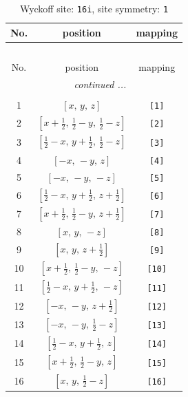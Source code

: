 \documentclass[fleqn,8pt]{jsarticle}
\begin{document}
\begin{longtable}{ccc}
\caption{Wyckoff site: {\tt 16i}, site symmetry: {\tt 1}}
 \\
 \hline \hline
No. & position & mapping \\ \hline \endfirsthead

\multicolumn{2}{l}{\tablename\ \thetable{}} \\
 \hline \hline
No. & position & mapping \\ \hline \endhead

 \hline \hline
\multicolumn{2}{r}{\footnotesize\it continued ...} \\ \endfoot

 \hline \hline
\multicolumn{2}{r}{} \\ \endlastfoot

1 & $\left[ x,\, y,\, z \right]$ & {\tt [1]} \\ \hline
2 & $\left[ x + \frac{1}{2},\, \frac{1}{2} - y,\, \frac{1}{2} - z \right]$ & {\tt [2]} \\ \hline
3 & $\left[ \frac{1}{2} - x,\, y + \frac{1}{2},\, \frac{1}{2} - z \right]$ & {\tt [3]} \\ \hline
4 & $\left[ - x,\, - y,\, z \right]$ & {\tt [4]} \\ \hline
5 & $\left[ - x,\, - y,\, - z \right]$ & {\tt [5]} \\ \hline
6 & $\left[ \frac{1}{2} - x,\, y + \frac{1}{2},\, z + \frac{1}{2} \right]$ & {\tt [6]} \\ \hline
7 & $\left[ x + \frac{1}{2},\, \frac{1}{2} - y,\, z + \frac{1}{2} \right]$ & {\tt [7]} \\ \hline
8 & $\left[ x,\, y,\, - z \right]$ & {\tt [8]} \\ \hline
9 & $\left[ x,\, y,\, z + \frac{1}{2} \right]$ & {\tt [9]} \\ \hline
10 & $\left[ x + \frac{1}{2},\, \frac{1}{2} - y,\, - z \right]$ & {\tt [10]} \\ \hline
11 & $\left[ \frac{1}{2} - x,\, y + \frac{1}{2},\, - z \right]$ & {\tt [11]} \\ \hline
12 & $\left[ - x,\, - y,\, z + \frac{1}{2} \right]$ & {\tt [12]} \\ \hline
13 & $\left[ - x,\, - y,\, \frac{1}{2} - z \right]$ & {\tt [13]} \\ \hline
14 & $\left[ \frac{1}{2} - x,\, y + \frac{1}{2},\, z \right]$ & {\tt [14]} \\ \hline
15 & $\left[ x + \frac{1}{2},\, \frac{1}{2} - y,\, z \right]$ & {\tt [15]} \\ \hline
16 & $\left[ x,\, y,\, \frac{1}{2} - z \right]$ & {\tt [16]} \\
\end{longtable}
\end{document}
